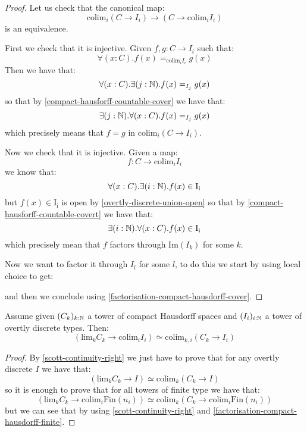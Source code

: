 \begin{proof}
Let us check that the canonical map:
\[\mathrm{colim}_i (C\to I_i) \to (C\to \mathrm{colim}_i I_i) \]
is an equivalence. 

First we check that it is injective. Given $f,g:C\to I_i$ such that:
\[\forall(x:C).  f(x) =_{\mathrm{colim}_iI_i} g(x)\]
Then we have that:
\[\forall(x:C).  \exists(j:\mathbb{N}). f(x) =_{I_j} g(x)\]
so that by \cref{compact-hausforff-countable-cover} we have that:
\[\exists(j:\mathbb{N}). \forall(x:C). f(x) =_{I_j} g(x)\]
which precisely means that $f=g$ in $\mathrm{colim}_i (C\to I_i)$.

Now we check that it is injective. Given a map:
\[f:C\to \mathrm{colim}_i I_i\]
we know that:
\[\forall(x:C). \exists(i:\mathbb{N}). f(x)\in \mathrm{I_i}\]
but $f(x)\in \mathrm{I_i}$ is open by \cref{overtly-discrete-union-open} so that by \cref{compact-hausforff-countable-covert} we have that:
\[\exists(i:\mathbb{N}). \forall(x:C).  f(x)\in \mathrm{I_i}\]
which precisely mean that $f$ factors through $\mathrm{Im}(I_k)$ for some $k$.

Now we want to factor it through $I_l$ for some $l$, to do this we start by using local choice to get:
\begin{center}
\end{center}
and then we conclude using \cref{factorisation-compact-hausdorff-cover}.
\end{proof}

\begin{theorem}
Assume given $(C_k)_{k:\mathbb{N}}$ a tower of compact Hausdorff spaces and $(I_i)_{i:\mathbb{N}}$ a tower of overtly discrete types. Then:
\[\left( \mathrm{lim}_k C_k \to \mathrm{colim}_i I_i\right) \simeq \mathrm{colim}_{k,i} (C_k\to I_i)\]
\end{theorem}

\begin{proof}
By \cref{scott-continuity-right} we just have to prove that for any overtly discrete $I$ we have that:
\[(\mathrm{lim}_kC_k\to I) \simeq \mathrm{colim}_k(C_k\to I)\]
so it is enough to prove that for all towers of finite type we have that:
\[(\mathrm{lim}_kC_k\to \mathrm{colim}_i\mathrm{Fin}(n_i)) \simeq \mathrm{colim}_k(C_k\to \mathrm{colim}_i\mathrm{Fin}(n_i))\]
but we can see that by using \cref{scott-continuity-right} and \cref{factorisation-compact-hausdorff-finite}.
\end{proof}